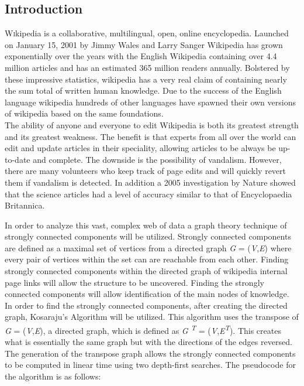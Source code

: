 \documentclass[twoside]{article}
\begin{document}
\begin{multicols}{2} %

\section{Introduction}

\lettrine[nindent=0em,lines=3]{W} ikipedia is a collaborative, multilingual, open, online 
encyclopedia. Launched on January 15, 2001 by Jimmy Wales and Larry Sanger 
Wikipedia has grown exponentially over the years with the English Wikipedia containing 
over 4.4 million articles and has an estimated 365 million readers annually. \cite{Wikipedia}
Bolstered by these impressive statistics, wikipedia has a very real claim of containing 
nearly the sum total of written human knowledge. Due to the success of the English language
wikipedia hundreds of other languages have spawned their own versions of wikipedia
based on the same foundations.\\

The ability of anyone and everyone to edit Wikipedia is both its greatest strength
and its greatest weakness. The benefit is that experts from all over the world can
edit and update articles in their speciality, allowing articles to be always be up-to-date 
and complete. The downside is the possibility of vandalism. However, there are many
volunteers who keep track of page edits and will quickly revert them if vandalism is 
detected. In addition a 2005 investigation by Nature showed that the science articles 
had a level of accuracy similar to that of Encyclopaedia Britannica. \cite{Nature}

\vfill
\columnbreak

In order to analyze this vast, complex web of data a graph theory technique of
strongly connected components will be utilized. Strongly connected components are
defined as a maximal set of vertices from a directed graph {\it  G} = ({\it  V},{\it E})
where every pair of vertices within the set can are reachable from each other. \cite{Cormen}
Finding strongly connected components within the
directed graph of wikipedia internal page links will allow the structure to be 
uncovered. Finding the strongly connected components will allow identification of
the main nodes of knowledge.\\

In order to find the strongly connected components, after creating the directed graph,
Kosaraju's Algorithm will be utilized. This algorithm uses the transpose of {\it  G} = ({\it  V},{\it E}),
a directed graph, which is defined as {\it  G \textsuperscript{T}} = ({\it  V},{\it E\textsuperscript{T}}). 
This creates what is essentially the same graph but with the directions of the edges reversed.
The generation of the transpose graph allows the strongly connected components
to be computed in linear time using two depth-first searches. The pseudocode for 
the algorithm is as follows: \cite{Cormen}\\


\end{multicols}
\end{document}
